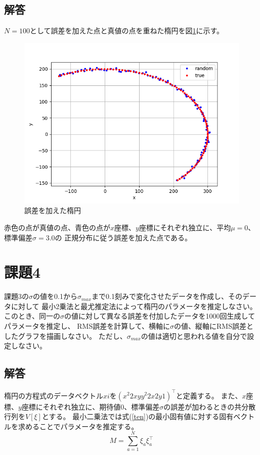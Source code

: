\documentclass[]{jarticle}          %
\begin{document}
\subsection{解答}
$N=100$として誤差を加えた点と真値の点を重ねた楕円を図\ref{figtwo}に示す。
\begin{figure}[!ht]
  \begin{center}
    \includegraphics[keepaspectratio, width=0.7\linewidth]{figures/kadai3.png}
  \end{center}
  \caption{誤差を加えた楕円}
  \label{figtwo}
\end{figure}

赤色の点が真値の点、青色の点が$x$座標、$y$座標にそれぞれ独立に、平均$\mu = 0$、標準偏差$\sigma = 3.0$の
正規分布に従う誤差を加えた点である。

\section{課題4}
課題3の$\sigma$の値を0.1から$\sigma_{max}$まで0.1刻みで変化させたデータを作成し、そのデータに対して
最小2乗法と最尤推定法によって楕円のパラメータを推定しなさい。
このとき、同一の$\sigma$の値に対して異なる誤差を付加したデータを1000回生成してパラメータを推定し、
RMS誤差を計算して、横軸に$\sigma$の値、縦軸にRMS誤差としたグラフを描画しなさい。
ただし、$\sigma_{max}$の値は適切と思われる値を自分で設定しなさい。

\subsection{解答}
楕円の方程式のデータベクトル$xi$を$(x^2 2xy y^2 2x 2y 1)^\top$と定義する。
また、$x$座標、$y$座標にそれぞれ独立に、期待値0、標準偏差$\sigma$の誤差が加わるときの共分散行列を$V[\xi]$とする。
最小二乗法では式(\ref{ten})の最小固有値に対する固有ベクトルを求めることでパラメータを推定する。
\begin{equation}
  M = \sum^N_{a=1}\xi_a\xi_a^{\top}
  \label{ten}
\end{equation}
\end{document}
